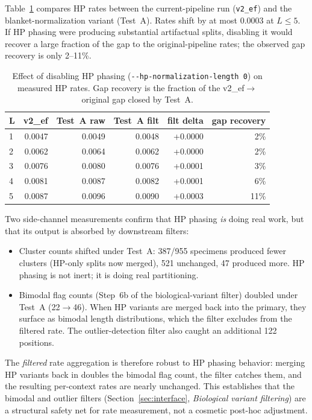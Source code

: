 \documentclass[11pt]{article}
\begin{document}
Table~\ref{tab:test_a} compares HP rates between the current-pipeline run
(\texttt{v2\_ef}) and the blanket-normalization variant (Test~A). Rates
shift by at most 0.0003 at $L \leq 5$. If HP phasing were producing
substantial artifactual splits, disabling it would recover a large fraction
of the gap to the original-pipeline rates; the observed gap recovery is
only 2--11\%.

\begin{table}[h]
\centering
\caption{Effect of disabling HP phasing (\texttt{-{}-hp-normalization-length~0}) on
measured HP rates. Gap recovery is the fraction of the v2\_ef$\to$original
gap closed by Test~A.}
\label{tab:test_a}
\begin{tabular}{lrrrrr}
\toprule
L & v2\_ef & Test~A raw & Test~A filt & filt delta & gap recovery \\
\midrule
1 & 0.0047 & 0.0049 & 0.0048 & +0.0000 & 2\% \\
2 & 0.0062 & 0.0064 & 0.0062 & +0.0000 & 2\% \\
3 & 0.0076 & 0.0080 & 0.0076 & +0.0001 & 3\% \\
4 & 0.0081 & 0.0087 & 0.0082 & +0.0001 & 6\% \\
5 & 0.0087 & 0.0096 & 0.0090 & +0.0003 & 11\% \\
\bottomrule
\end{tabular}
\end{table}

Two side-channel measurements confirm that HP phasing \emph{is} doing real
work, but that its output is absorbed by downstream filters:

\begin{itemize}
\item Cluster counts shifted under Test~A: 387/955 specimens produced fewer
clusters (HP-only splits now merged), 521 unchanged, 47 produced more. HP
phasing is not inert; it is doing real partitioning.
\item Bimodal flag counts (Step~6b of the biological-variant filter)
doubled under Test~A (22$\to$46). When HP variants are merged back into the
primary, they surface as bimodal length distributions, which the filter
excludes from the filtered rate. The outlier-detection filter also caught an
additional 122 positions.
\end{itemize}

The \emph{filtered} rate aggregation is therefore robust to HP phasing
behavior: merging HP variants back in doubles the bimodal flag count, the
filter catches them, and the resulting per-context rates are nearly
unchanged. This establishes that the bimodal and outlier filters
(Section~\ref{sec:interface}, \emph{Biological variant filtering}) are a
structural safety net for rate measurement, not a cosmetic post-hoc
adjustment.
\end{document}
